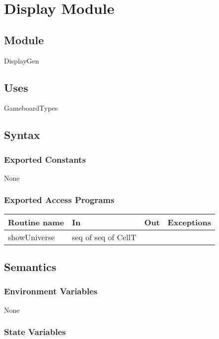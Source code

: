 \documentclass[12pt]{article}
\begin{document}
\newpage

\section* {Display Module}

\subsection* {Module}

DisplayGen

\subsection* {Uses}

GameboardTypes

\subsection* {Syntax}

\subsubsection* {Exported Constants}

None

\subsubsection* {Exported Access Programs}

\begin{tabular}{| l | l | l | l |}
\hline
\textbf{Routine name} & \textbf{In} & \textbf{Out} & \textbf{Exceptions}\\
\hline
showUniverse & seq of seq of CellT & ~ & ~\\
\hline
\end{tabular}

\subsection* {Semantics}

\subsubsection* {Environment Variables}

None

\subsubsection* {State Variables}
\end{document}
